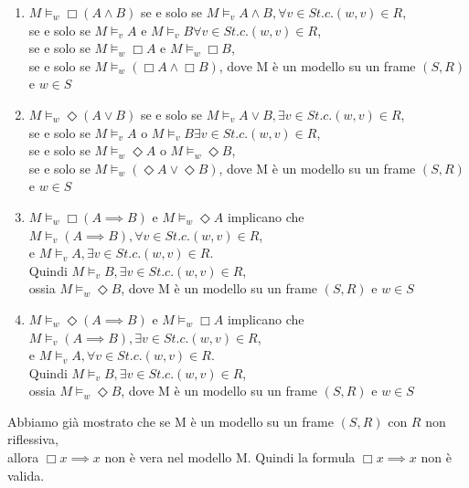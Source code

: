 \documentclass[a4paper,12pt]{article}
\theoremstyle{def}
\theoremstyle{prop}
\theoremstyle{esempio}
\theoremstyle{dimostrazione}
\theoremstyle{teo}
\theoremstyle{osservazione}
\begin{document}
\begin{enumerate}
	\item \(M \vDash_w \Box (A \land B)\) se e solo se \(M \vDash_v A \land B, \forall v \in S t.c. (w,v) \in R\),\\
	      se e solo se \(M \vDash_v A \text{ e } M \vDash_v B \forall v \in S t.c. (w,v) \in R\),\\
	      se e solo se \(M \vDash_w \Box A\) e \(M \vDash_w \Box B\),\\
	      se e solo se \(M \vDash_w (\Box A \land \Box B)\), dove M è un modello su un frame \((S,R)\) e \(w \in S\)
	\item \(M \vDash_w \Diamond (A \lor B)\) se e solo se \(M \vDash_v A \lor B, \exists v \in S t.c. (w,v) \in R\),\\
	      se e solo se \(M \vDash_v A \text{ o } M \vDash_v B \exists v \in S t.c. (w,v) \in R\),\\
	      se e solo se \(M \vDash_w \Diamond A \text{ o } M \vDash_w \Diamond B\),\\
	      se e solo se \(M \vDash_w (\Diamond A \lor \Diamond B)\), dove M è un modello su un frame \((S,R)\) e \(w \in S\)
	\item \(M \vDash_w \Box (A \implies B)\) e \(M \vDash_w \Diamond A\) implicano che \(M \vDash_v (A \implies B), \forall v \in S t.c. (w,v) \in R\),\\
	      e \(M \vDash_v A, \exists v \in S t.c. (w,v) \in R\).\\
	      Quindi \(M \vDash_v B, \exists  v \in S t.c. (w,v) \in R\),\\
	      ossia \(M \vDash_w \Diamond B\), dove M è un modello su un frame \((S,R)\) e \(w \in S\)
	\item \(M \vDash_w \Diamond (A \implies B)\) e \(M \vDash_w \Box A\) implicano che \(M \vDash_v (A \implies B), \exists v \in S t.c. (w,v) \in R\),\\
	      e \(M \vDash_v A, \forall v \in S t.c. (w,v) \in R\).\\
	      Quindi \(M \vDash_v B, \exists v \in S t.c. (w,v) \in R\),\\
	      ossia \(M \vDash_w \Diamond B\), dove M è un modello su un frame \((S,R)\) e \(w \in S\)\\
\end{enumerate}
Abbiamo già mostrato che se M è un modello su un frame \((S,R)\) con \(R\) non riflessiva,\\
allora \(\Box x \implies x\) non è vera nel modello M. Quindi la formula \(\Box x \implies x\) non è valida.
\end{document}
